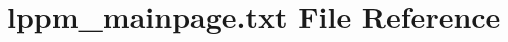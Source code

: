 \hypertarget{lppm__mainpage_8txt}{\section{lppm\+\_\+mainpage.\+txt File Reference}
\label{lppm__mainpage_8txt}
}
